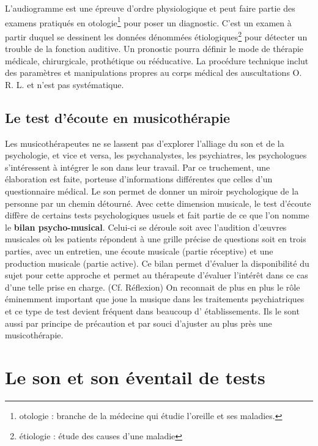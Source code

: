   L'audiogramme est une épreuve d'ordre physiologique et peut faire partie des examens  pratiqués en otologie\footnote{otologie : branche de la médecine
  	qui étudie l'oreille et ses maladies.} pour poser un diagnostic. 
   C'est un examen à partir duquel se
  dessinent les données dénommées étiologiques\footnote{étiologie : étude des causes
  	d'une maladie} pour détecter un trouble de la fonction auditive. Un pronostic pourra définir le mode de thérapie
médicale, chirurgicale, prothétique ou rééducative. La procédure
technique inclut des paramètres et manipulations propres au corps
médical des auscultations O. R. L. et  n'est pas systématique.






\subsection{Le test d'écoute en musicothérapie}

Les musicothérapeutes ne se lassent pas d'explorer l'alliage du son
 et de la psychologie, et vice
 et versa, les psychanalystes, les psychiatres, les psychologues
 s'intéressent à intégrer le son dans leur travail. Par ce truchement,
 une élaboration est faite, porteuse d'informations différentes que
 celles d'un questionnaire médical. Le son permet de donner un miroir
 psychologique de la personne par un chemin détourné. Avec cette dimension
 musicale, le test d'écoute diffère de certains tests psychologiques usuels
 et fait partie de ce que l'on nomme le \textbf{ bilan
   psycho-musical}. Celui-ci se déroule soit avec l'audition d'\oe uvres
 musicales où les patients répondent à une grille précise de questions
  soit en trois parties, avec un entretien,
 une écoute musicale (partie réceptive) et une production musicale
 (partie active).
Ce bilan permet d'évaluer la disponibilité du sujet pour cette
approche et permet au thérapeute d'évaluer l'intérêt dans ce cas
d'une telle prise en charge. (Cf. Réflexion)
 On reconnait de plus en plus le rôle éminemment important que joue la musique
 dans les traitements psychiatriques et ce type de test devient
 fréquent dans beaucoup d' établissements. Ils le sont aussi par principe de précaution et
 par souci d'ajuster au plus près une
 musicothérapie.



  
\section{Le son et son éventail de tests}
\label{musicothEtpsycho}

